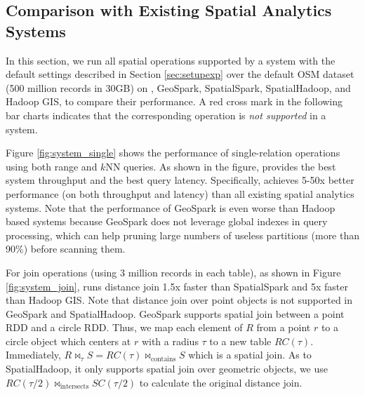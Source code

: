 \subsection{Comparison with Existing Spatial Analytics Systems}
\label{sec:comparison}
In this section, we run all spatial operations supported by a system
with the default settings described in Section \ref{sec:setupexp} over
the default OSM dataset (500 million records in 30GB) on \name,
GeoSpark, SpatialSpark, SpatialHadoop, and Hadoop GIS, to compare their
performance.  A red cross mark in the following bar charts indicates
that the corresponding operation is {\em not supported} in a system.




Figure \ref{fig:system_single} shows the performance of
single-relation operations using both range and $k$NN queries. As
shown in the figure, \name provides the best system throughput and the
best query latency. Specifically, \name achieves 5-50x better
performance (on both throughput and latency) than all existing spatial
analytics systems. Note that the performance of GeoSpark is even worse
than Hadoop based systems because GeoSpark does not leverage global
indexes in query processing, which can help pruning large numbers
of useless partitions (more than 90\%) before scanning them.


For join operations (using 3 million records in each table), as shown
in Figure \ref{fig:system_join}, \name runs distance join 1.5x faster
than SpatialSpark and 5x faster than Hadoop GIS. Note that distance join
over point objects is not supported in GeoSpark and SpatialHadoop.
GeoSpark supports spatial join between a point RDD and a circle RDD.
Thus, we map each element of $R$ from a point $r$ to a circle object
which centers at $r$ with a radius $\tau$ to a new table $RC(\tau)$.
Immediately, $R \Join_{\tau} S = RC(\tau)\Join_{\textrm{contains}} S$
which is a spatial join. As to SpatialHadoop, it only supports spatial
join over geometric objects, we use $RC(\tau/2)\Join_{\textrm{intersects}} SC(\tau/2)$
to calculate the original distance join.

